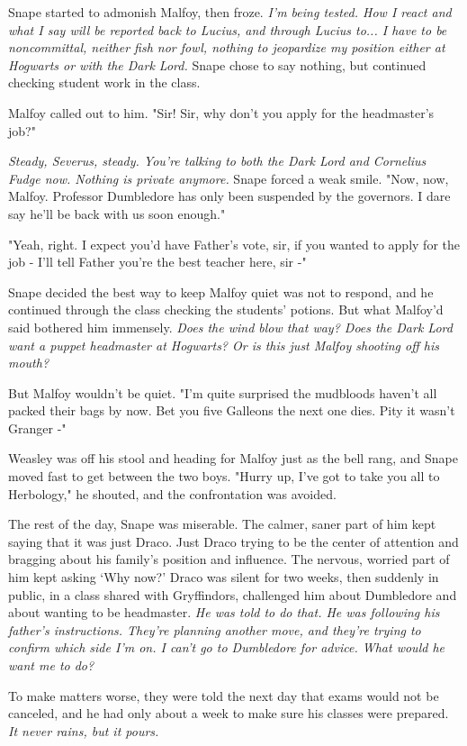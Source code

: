 \documentclass[a4paper,11pt]{article}
\begin{document}
Snape started to admonish Malfoy, then froze. \emph{I'm being tested. How I react and what I say will be reported back to Lucius, and through Lucius to... I have to be noncommittal, neither fish nor fowl, nothing to jeopardize my position either at Hogwarts or with the Dark Lord.} Snape chose to say nothing, but continued checking student work in the class.

Malfoy called out to him. "Sir! Sir, why don't you apply for the headmaster's job?"

\emph{Steady, Severus, steady. You're talking to both the Dark Lord and Cornelius Fudge now. Nothing is private anymore.} Snape forced a weak smile. "Now, now, Malfoy. Professor Dumbledore has only been suspended by the governors. I dare say he'll be back with us soon enough."

"Yeah, right. I expect you'd have Father's vote, sir, if you wanted to apply for the job - I'll tell Father you're the best teacher here, sir -"

Snape decided the best way to keep Malfoy quiet was not to respond, and he continued through the class checking the students' potions. But what Malfoy'd said bothered him immensely. \emph{Does the wind blow that way? Does the Dark Lord want a puppet headmaster at Hogwarts? Or is this just Malfoy shooting off his mouth?}

But Malfoy wouldn't be quiet. "I'm quite surprised the mudbloods haven't all packed their bags by now. Bet you five Galleons the next one dies. Pity it wasn't Granger -"

Weasley was off his stool and heading for Malfoy just as the bell rang, and Snape moved fast to get between the two boys. "Hurry up, I've got to take you all to Herbology," he shouted, and the confrontation was avoided.

The rest of the day, Snape was miserable. The calmer, saner part of him kept saying that it was just Draco. Just Draco trying to be the center of attention and bragging about his family's position and influence. The nervous, worried part of him kept asking `Why now?' Draco was silent for two weeks, then suddenly in public, in a class shared with Gryffindors, challenged him about Dumbledore and about wanting to be headmaster. \emph{He was told to do that. He was following his father's instructions. They're planning another move, and they're trying to confirm which side I'm on. I can't go to Dumbledore for advice. What would he want me to do?}

To make matters worse, they were told the next day that exams would not be canceled, and he had only about a week to make sure his classes were prepared. \emph{It never rains, but it pours.}
\end{document}
